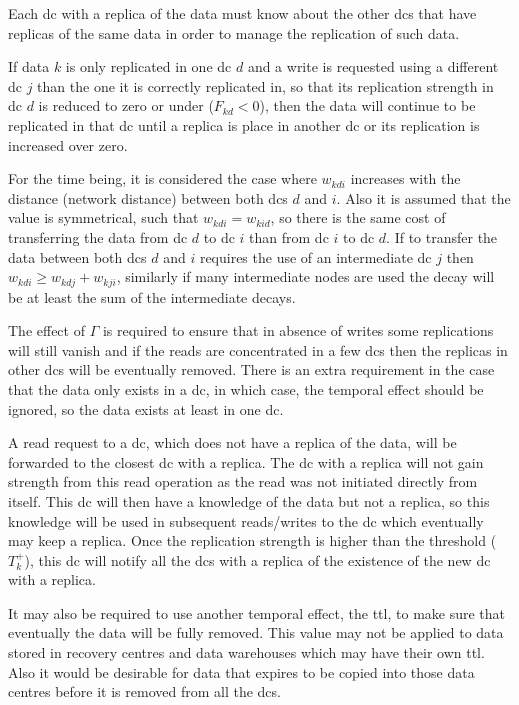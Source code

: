 \documentclass[english]{article}
\begin{document}
Each \gls{dc} with a replica of the data must know about the other \glspl{dc} that have replicas of the same data in order to manage the replication of such data.

If data $k$ is only replicated in one \gls{dc} $d$ and a write is requested using a different \gls{dc} $j$ than the one it is correctly replicated in, so that its replication strength in \gls{dc} $d$ is reduced to zero or under ($F_{kd} < 0$), then the data will continue to be replicated in that \gls{dc} until a replica is place in another \gls{dc} or its replication is increased over zero.

For the time being, it is considered the case where $w_{kdi}$ increases with the distance (network distance) between both \glspl{dc} $d$ and $i$. Also it is assumed that the value is symmetrical, such that $w_{kdi} = w_{kid}$, so there is the same cost of transferring the data from \gls{dc} $d$ to \gls{dc} $i$ than from \gls{dc} $i$ to \gls{dc} $d$. If to transfer the data between both \glspl{dc} $d$ and $i$ requires the use of an intermediate \gls{dc} $j$ then $w_{kdi} \ge w_{kdj} + w_{kji}$, similarly if many intermediate nodes are used the decay will be at least the sum of the intermediate decays.

The effect of $\Gamma$ is required to ensure that in absence of writes some replications will still vanish and if the reads are concentrated in a few \glspl{dc} then the replicas in other \glspl{dc} will be eventually removed. There is an extra requirement in the case that the data only exists in a \gls{dc}, in which case, the temporal effect should be ignored, so the data exists at least in one \gls{dc}.

A read request to a \gls{dc}, which does not have a replica of the data, will be forwarded to the closest \gls{dc} with a replica. The \gls{dc} with a replica will not gain strength from this read operation as the read was not initiated directly from itself. This \gls{dc} will then have a knowledge of the data but not a replica, so this knowledge will be used in subsequent reads/writes to the \gls{dc} which eventually may keep a replica. Once the replication strength is higher than the threshold ($T^{+}_{k}$), this \gls{dc} will notify all the \glspl{dc} with a replica of the existence of the new \gls{dc} with a replica.

It may also be required to use another temporal effect, the \gls{ttl}, to make sure that eventually the data will be fully removed. This value may not be applied to data stored in recovery centres and data warehouses which may have their own \gls{ttl}. Also it would be desirable for data that expires to be copied into those data centres before it is removed from all the \glspl{dc}.
\end{document}
